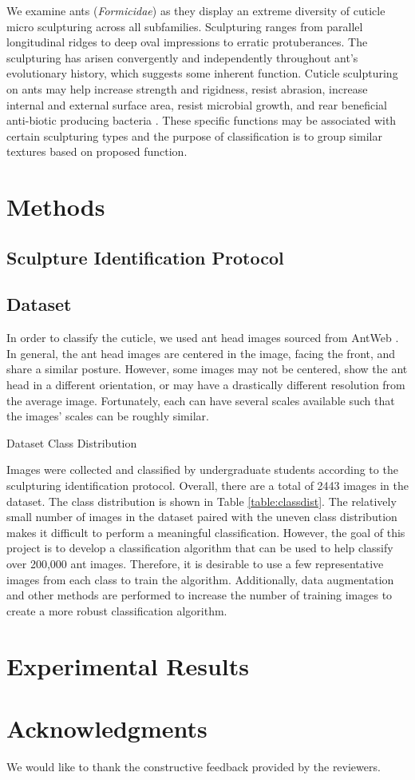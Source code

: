 \documentclass{aci}
\begin{document}
We examine ants (\textit{Formicidae}) as they display an extreme diversity of
cuticle micro sculpturing across all subfamilies. Sculpturing ranges from
parallel longitudinal ridges to deep oval impressions to erratic protuberances.
The sculpturing has arisen convergently and independently throughout ant’s
evolutionary history, which suggests some inherent function. Cuticle sculpturing
on ants may help increase strength and rigidness, resist abrasion, increase
internal and external surface area, resist microbial growth, and rear beneficial
anti-biotic producing bacteria \cite{johnson_effect_2011,
  bruckner_relationship_2017, currie_coevolved_2006}. These specific functions may
be associated with certain sculpturing types and the purpose of classification
is to group similar textures based on proposed function.

\section{Methods}

\subsection{Sculpture Identification Protocol}

\subsection{Dataset}
In order to classify the cuticle, we used ant head images sourced from AntWeb
\cite{antweb}. In general, the ant head images are centered in the image, facing
the front, and share a similar posture. However, some images may not be
centered, show the ant head in a different orientation, or may have a
drastically different resolution from the average image. Fortunately, each can
have several scales available such that the images' scales can be roughly
similar.

\begin{table}[h]
  \centering
  \caption{Dataset Class Distribution}
  \label{table:classdist}
  
\end{table}

Images were collected and classified by undergraduate students according to the
sculpturing identification protocol. Overall, there are a total of 2443 images
in the dataset. The class distribution is shown in Table \ref{table:classdist}.
The relatively small number of images in the dataset paired with the uneven
class distribution makes it difficult to perform a meaningful classification.
However, the goal of this project is to develop a classification algorithm that
can be used to help classify over 200,000 ant images. Therefore, it is desirable
to use a few representative images from each class to train the algorithm.
Additionally, data augmentation and other methods are performed to increase the
number of training images to create a more robust classification algorithm.

\section{Experimental Results}


\section*{Acknowledgments}
We would like to thank the constructive feedback provided by the reviewers.



\end{document}
